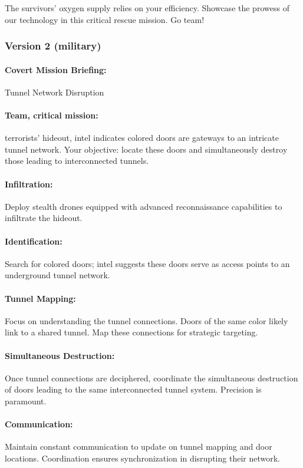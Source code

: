 The survivors' oxygen supply relies on your efficiency. Showcase the prowess of our technology in this critical rescue mission. Go team!


\subsubsection{Version 2 (military)}

\paragraph{Covert Mission Briefing:} Tunnel Network Disruption

\paragraph{Team, critical mission:} terrorists' hideout, intel indicates colored doors are gateways to an intricate tunnel network. Your objective: locate these doors and simultaneously destroy those leading to interconnected tunnels.

\paragraph{Infiltration:} Deploy stealth drones equipped with advanced reconnaissance capabilities to infiltrate the hideout.

\paragraph{Identification:} Search for colored doors; intel suggests these doors serve as access points to an underground tunnel network.

\paragraph{Tunnel Mapping:} Focus on understanding the tunnel connections. Doors of the same color likely link to a shared tunnel. Map these connections for strategic targeting.

\paragraph{Simultaneous Destruction:} Once tunnel connections are deciphered, coordinate the simultaneous destruction of doors leading to the same interconnected tunnel system. Precision is paramount.

\paragraph{Communication:} Maintain constant communication to update on tunnel mapping and door locations. Coordination ensures synchronization in disrupting their network.

